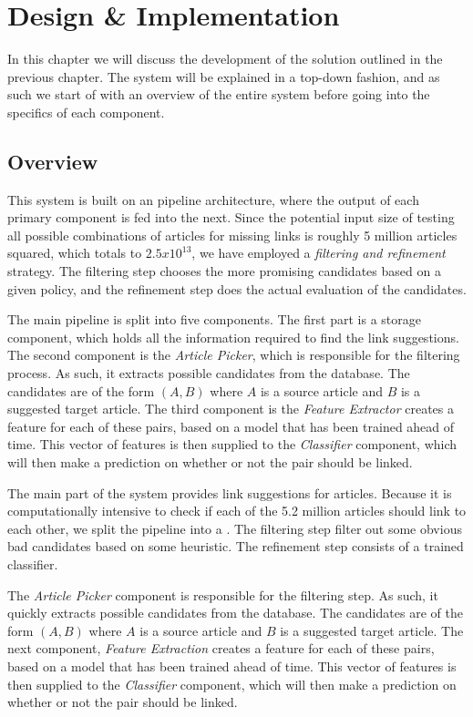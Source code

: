 \chapter{Design \& Implementation}\label{chap:design}
In this chapter we will discuss the development of the solution outlined in the previous chapter. The system will be explained in a top-down fashion, and as such we start of with an overview of the entire system before going into the specifics of each component.

\section{Overview}\label{sec:design_overview}
This system is built on an pipeline architecture, where the output of each primary component is fed into the next. Since the potential input size of testing all possible combinations of articles for missing links is roughly 5 million articles squared, which totals to $2.5x10^13$, we have employed a \emph{filtering and refinement} strategy. The filtering step chooses the more promising candidates based on a given policy, and the refinement step does the actual evaluation of the candidates.

The main pipeline is split into five components. The first part is a storage component, which holds all the information required to find the link suggestions. The second component is the \emph{Article Picker}, which is responsible for the filtering process. As such, it extracts possible candidates from the database. The candidates are of the form $(A,B)$ where $A$ is a source article and $B$ is a suggested target article. The third component is the \emph{Feature Extractor} creates a feature for each of these pairs, based on a model that has been trained ahead of time. This vector of features is then supplied to the \emph{Classifier} component, which will then make a prediction on whether or not the pair should be linked.


The main part of the system provides link suggestions for articles. Because it is computationally intensive to check if each of the 5.2 million articles should link to each other, we split the pipeline into a . The filtering step filter out some obvious bad candidates based on some heuristic. The refinement step consists of a trained classifier.

The \emph{Article Picker} component is responsible for the filtering step. As such, it quickly extracts possible candidates from the database. The candidates are of the form $(A,B)$ where $A$ is a source article and $B$ is a suggested target article. The next component, \emph{Feature Extraction} creates a feature for each of these pairs, based on a model that has been trained ahead of time. This vector of features is then supplied to the \emph{Classifier} component, which will then make a prediction on whether or not the pair should be linked.

